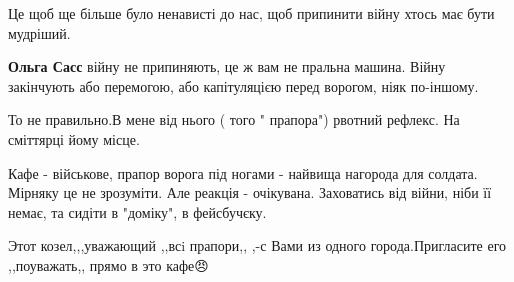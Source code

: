 \begin{itemize}
 
Це щоб ще більше було ненависті до нас, щоб припинити війну хтось має бути мудріший.

\begin{itemize}
 
\textbf{Ольга Сасс} війну не припиняють, це ж вам не пральна машина. Війну
закінчують або перемогою, або капітуляцією перед ворогом, ніяк по-іншому.
\end{itemize}


 
То не правильно.В мене від нього ( того " прапора") рвотний рефлекс. На сміттярці йому місце.

 

Кафе - військове, прапор ворога під ногами - найвища нагорода для солдата.
Мірняку це не зрозуміти. Але реакція - очікувана. Заховатись від війни, ніби її
немає, та сидіти в "доміку", в фейсбучєку.

\begin{itemize}
 
Этот козел,,,уважающий ,,всi прапори,, ,-с Вами из одного города.Пригласите его
,,поуважать,, прямо в это кафе😠
\end{itemize}

 

\end{itemize}
